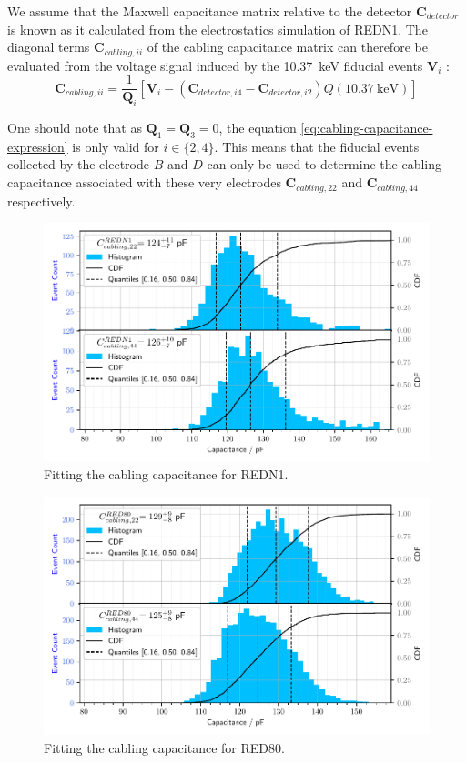 We assume that the Maxwell capacitance matrix relative to the detector $\bm{C}_{detector}$ is known as it calculated from the electrostatics simulation of REDN1. The diagonal terms $\bm{C}_{cabling, ii}$ of the cabling capacitance matrix can therefore be evaluated from the voltage signal induced by the \SI{10.37}{\kilo\eV} fiducial events $\bm{V}_{i}$ :
\begin{equation}
\label{eq:cabling-capacitance-expression}
\bm{C}_{cabling, ii}
=
\frac{1}{\bm{Q}_i} \left[ \bm{V}_{i} - \left( \bm{C}_{detector, i4} - \bm{C}_{detector, i2} \right) Q(\SI{10.37}{\kilo\eV}) \right]
\end{equation}

One should note that as $\bm{Q}_1 = \bm{Q}_3 = 0$, the equation \ref{eq:cabling-capacitance-expression} is only valid for $i \in \{ 2,4 \}$. This means that the fiducial events collected by the electrode $B$ and $D$ can only be used to determine the cabling capacitance associated with these very electrodes $\bm{C}_{cabling, 22}$ and $\bm{C}_{cabling, 44}$ respectively.

\begin{figure}
\centering
\includegraphics[scale=1]{Figures/ElectrodesExperimental/redn1_cabling_capacitance_fitting.pdf}
\caption{Fitting the cabling capacitance for REDN1.}
\label{fig:red80-cabling-capacitance}
\end{figure}

\begin{figure}
\centering
\includegraphics[scale=1]{Figures/ElectrodesExperimental/red80_cabling_capacitance_fitting.pdf}
\caption{Fitting the cabling capacitance for RED80.}
\label{fig:red80-cabling-capacitance}
\end{figure}

